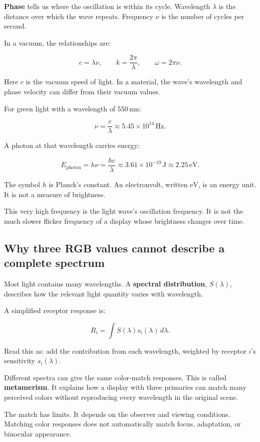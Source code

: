 \textbf{Phase} tells us where the oscillation is within its cycle. Wavelength \(\lambda\) is the distance over which the wave repeats. Frequency \(\nu\) is the number of cycles per second.

In a vacuum, the relationships are:

\[
c=\lambda\nu,\qquad
k=\frac{2\pi}{\lambda},\qquad
\omega=2\pi\nu.
\]

Here \(c\) is the vacuum speed of light. In a material, the wave's wavelength and phase velocity can differ from their vacuum values.

For green light with a wavelength of \(550\,\mathrm{nm}\):

\[
\nu=\frac{c}{\lambda}
\approx 5.45\times10^{14}\,\mathrm{Hz}.
\]

A photon at that wavelength carries energy:

\[
E_{\mathrm{photon}}=h\nu=\frac{hc}{\lambda}
\approx 3.61\times10^{-19}\,\mathrm{J}
\approx 2.25\,\mathrm{eV}.
\]

The symbol \(h\) is Planck's constant. An electronvolt, written \(\mathrm{eV}\), is an energy unit. It is not a measure of brightness.

This very high frequency is the light wave's oscillation frequency. It is not the much slower flicker frequency of a display whose brightness changes over time.

\subsection{Why three RGB values cannot describe a complete spectrum}\label{04-visual-computing-ii-ch043-why-three-rgb-values-cannot-describe-a-complete-spectrum}

Most light contains many wavelengths. A \textbf{spectral distribution}, \(S(\lambda)\), describes how the relevant light quantity varies with wavelength.

A simplified receptor response is:

\[
R_i=\int S(\lambda)s_i(\lambda)\,d\lambda.
\]

Read this as: add the contribution from each wavelength, weighted by receptor \(i\)'s sensitivity \(s_i(\lambda)\).

Different spectra can give the same color-match responses. This is called \textbf{metamerism}. It explains how a display with three primaries can match many perceived colors without reproducing every wavelength in the original scene.

The match has limits. It depends on the observer and viewing conditions. Matching color responses does not automatically match focus, adaptation, or binocular appearance.

